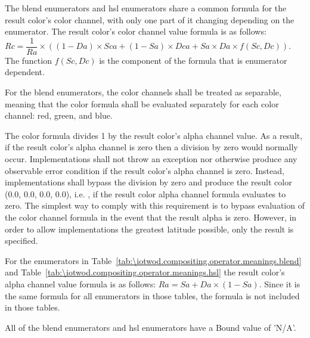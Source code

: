 \pnum
The blend enumerators and hsl enumerators share a common formula for the result 
color's color channel, with only one part of it changing depending on the 
enumerator. The result color's color channel value formula is as follows: $Rc = 
\dfrac{1}{Ra} \times ((1 - Da) \times Sca + (1 - Sa) \times Dca + Sa \times Da 
\times f(Sc, Dc))$. The function $f(Sc, Dc)$ is the component of the formula 
that is enumerator dependent.

\pnum
For the blend enumerators, the color channels shall be treated as separable, 
meaning that the color formula shall be evaluated separately for each color 
channel: red, green, and blue.

\pnum
The color formula divides 1 by the result color's alpha channel value. As a 
result, if the result color's alpha channel is zero then a division by zero 
would normally occur. Implementations shall not throw an exception nor  
otherwise produce any observable error condition if the result color's alpha 
channel is zero. Instead, implementations shall bypass the division by zero and 
produce the result color (0.0, 0.0, 0.0, 0.0), i.e. , if the result color alpha channel formula 
evaluates to zero.
\enternote
The simplest way to comply with this requirement is to bypass evaluation of the 
color channel formula in the event that the result alpha is zero. However, in 
order to allow implementations the greatest latitude possible, only the result 
is specified.
\exitnote

\pnum
For the enumerators in 
Table~\ref{tab:\iotwod.compositing.operator.meanings.blend} and 
Table~\ref{tab:\iotwod.compositing.operator.meanings.hsl} the result color's 
alpha channel value formula is as follows: $Ra = Sa + Da \times (1 - Sa)$.
\enternote
Since it is the same formula for all enumerators in those tables, the formula 
is not included in those tables.
\exitnote

\pnum
All of the blend enumerators and hsl enumerators have a Bound value of 'N/A'.

